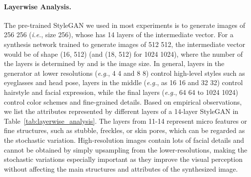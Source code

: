 \documentclass[final]{cvpr}
\def\eg{\emph{e.g.}}
\def\ie{\emph{i.e.}}
\begin{document}
\vspace{-5pt}
\paragraph{Layerwise Analysis.} 
The pre-trained StyleGAN we used in most experiments is to generate images of 256  256 (\ie, size 256), whose has 14 layers of the intermediate vector.
For a synthesis network trained to generate images of 512  512, the intermediate vector would be of shape (16, 512) (and (18, 512) for 1024  1024), where the number of the layers  is determined by  and  is the image size.
In general, layers in the generator at lower resolutions (\eg, 4  4 and 8  8) control high-level styles such as eyeglasses and head pose,
layers in the middle (\eg, as 16  16 and 32  32) control hairstyle and facial expression, while the final layers (\eg, 64  64 to 1024  1024) control color schemes and fine-grained details.
Based on empirical observations, we list the attributes represented by different layers of a 14-layer StyleGAN in Table~\ref{tab:layerwise_analysis}.
The layers from 11-14 represent micro features or fine structures, such as stubble, freckles, or skin pores, which can be regarded as the stochastic variation.
High-resolution images contain lots of facial details and cannot be obtained by simply upsampling from the lower-resolutions, making the stochastic variations especially important as they improve the visual perception without affecting the main structures and attributes of the synthesized image.

\begin{table}[th]
\centering
\caption{The Empirical Layerwise Analysis of a 14-layer StyleGAN Generator. The 13-th and 14-th layers are omitted since there is basically no visible difference.}
\label{tab:layerwise_analysis}
\end{table}
\end{document}
